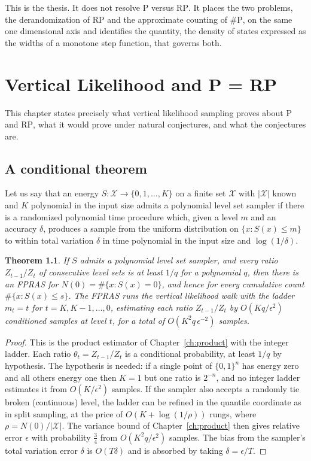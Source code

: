 \documentclass[11pt,twoside,openany]{book}
\theoremstyle{plain}
\newtheorem{theorem}{Theorem}[chapter]
\theoremstyle{definition}
\theoremstyle{remark}
\newcommand{\cX}{\mathcal{X}}
\newcommand{\RP}{\mathrm{RP}}
\newcommand{\Pc}{\mathrm{P}}
\newcommand{\sharpP}{\#\mathrm{P}}
\begin{document}
This is the thesis. It does not resolve $\Pc$ versus $\RP$. It places the two problems, the derandomization of $\RP$ and the approximate counting of $\sharpP$, on the same one dimensional axis and identifies the quantity, the density of states expressed as the widths of a monotone step function, that governs both.

\chapter{Vertical Likelihood and P = RP}
\label{ch:prp}

This chapter states precisely what vertical likelihood sampling proves about $\Pc$ and $\RP$, what it would prove under natural conjectures, and what the conjectures are.

\section{A conditional theorem}

Let us say that an energy $S: \cX \to \{0, 1, \dots, K\}$ on a finite set $\cX$ with $|\cX|$ known and $K$ polynomial in the input size admits a polynomial level set sampler if there is a randomized polynomial time procedure which, given a level $m$ and an accuracy $\delta$, produces a sample from the uniform distribution on $\{ x : S(x) \le m \}$ to within total variation $\delta$ in time polynomial in the input size and $\log(1/\delta)$.

\begin{theorem}
\label{thm:vertical_condfpras}
If $S$ admits a polynomial level set sampler, and every ratio $Z_{t-1} / Z_t$ of consecutive level sets is at least $1/q$ for a polynomial $q$, then there is an FPRAS for $N(0) = \#\{ x : S(x) = 0 \}$, and hence for every cumulative count $\#\{ x : S(x) \le s \}$. The FPRAS runs the vertical likelihood walk with the ladder $m_t = t$ for $t = K, K-1, \dots, 0$, estimating each ratio $Z_{t-1} / Z_t$ by $O(K q / \epsilon^2)$ conditioned samples at level $t$, for a total of $O(K^2 q \, \epsilon^{-2})$ samples.
\end{theorem}

\begin{proof}
This is the product estimator of Chapter~\ref{ch:product} with the integer ladder. Each ratio $\theta_t = Z_{t-1} / Z_t$ is a conditional probability, at least $1/q$ by hypothesis. The hypothesis is needed: if a single point of $\{0,1\}^n$ has energy zero and all others energy one then $K = 1$ but one ratio is $2^{-n}$, and no integer ladder estimates it from $O(K / \epsilon^2)$ samples. If the sampler also accepts a randomly tie broken (continuous) level, the ladder can be refined in the quantile coordinate as in split sampling, at the price of $O(K + \log(1/\rho))$ rungs, where $\rho = N(0)/|\cX|$. The variance bound of Chapter~\ref{ch:product} then gives relative error $\epsilon$ with probability $\tfrac34$ from $O(K^2 q / \epsilon^2)$ samples. The bias from the sampler's total variation error $\delta$ is $O(T \delta)$ and is absorbed by taking $\delta = \epsilon / T$.
\end{proof}
\end{document}
